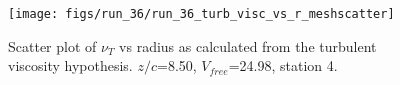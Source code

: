 \begin{figure}[H]
\centering
\texttt{[image: figs/run\_36/run\_36\_turb\_visc\_vs\_r\_meshscatter]}
\caption{Scatter plot of $\nu_T$ vs radius as calculated from the turbulent viscosity hypothesis. $z/c$=8.50, $V_{free}$=24.98, station 4.}
\label{fig:run_36_turb_visc_vs_r_meshscatter}
\end{figure}


